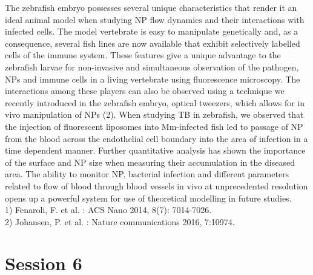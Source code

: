 \documentclass{article}
\begin{document}
{The zebrafish embryo possesses several unique characteristics that render it an ideal animal model when studying NP flow dynamics and their interactions with infected cells. The model vertebrate is easy to manipulate genetically and, as a consequence, several fish lines are now available that exhibit selectively labelled cells of the immune system. These features give a unique advantage to the zebrafish larvae for non-invasive and simultaneous observation of the pathogen, NPs and immune cells in a living vertebrate using fluorescence microscopy. The interactions among these players can also be observed using a technique we recently introduced in the zebrafish embryo, optical tweezers, which allows for in vivo manipulation of NPs (2). When studying TB in zebrafish, we observed that the injection of fluorescent liposomes into Mm-infected fish led to passage of NP from the blood across the endothelial cell boundary into the area of infection in a time dependent manner. Further quantitative analysis has shown the importance of the surface and NP size when measuring their accumulation in the diseased area. The ability to monitor NP, bacterial infection and different parameters related to flow of blood through blood vessels in vivo at unprecedented resolution opens up a powerful system for use of theoretical modelling in future studies.\\
\small{
1) Fenaroli, F. et al. : ACS Nano 2014, 8(7): 7014-7026.\\
2) Johansen, P. et al. : Nature communications 2016, 7:10974.}
}

\section*{Session 6}
\end{document}
